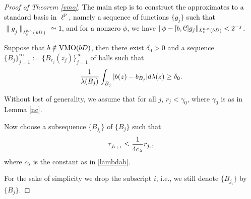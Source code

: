 \documentclass[11pt,a4paper]{amsart}
\numberwithin{equation}{section}
\begin{document}
{\begin{proof}[Proof of   Theorem \ref{vmo}]
\textcolor{black}{
The main step is to construct the approximates to a standard basis in $\ell^{p}$, namely a sequence of functions $\{g_{j}\}$ such that
$ \lVert g_{j } \rVert _{L_v^{p,\kappa}(bD)} \simeq 1$,  and for a nonzero $ \phi$,   we have $\lVert \phi - [b, \EuScript C] g_{j}\rVert
 _{L_v^{p,\kappa}(bD) } <2^{-j}$.  }

Suppose that $b\notin {\rm VMO}(bD)$, then there exist $\delta_0>0$ and a sequence $\{B_j\}_{j=1}^\infty:=\{B_{r_j}(z_j)\}_{j=1}^\infty$ of balls such that
\begin{align}\label{delta0}
{1\over \lambda(B_j)} \int_{B_j} |b(z)-b_{B_j}|d\lambda(z)\geq \delta_0.
\end{align}

Without lost of generality, we assume that for all $j$, $r_j<\gamma_0$, where $\gamma_0$ is
as in Lemma \ref{nc}.



Now choose a subsequence $\{B_{j_i}\}$ of $\{B_j\}$ such that
\begin{align}\label{ratio1}
r_{j_{i+1}} \leq{1\over 4c_\lambda} r_{j_{i}},
\end{align}
where $c_\lambda$ is the constant as in \eqref{lambdab}.

For the sake of simplicity we drop the subscript $i$, i.e., we still denote $\{B_{j_i}\}$ by $\{B_{j}\}$.



\end{proof}}
\end{document}
